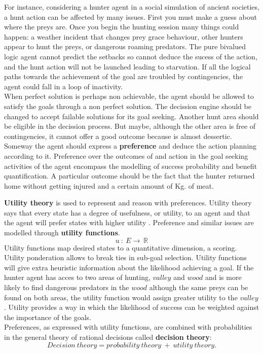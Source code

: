 \documentclass[11pt,oneside,a4paper,openright]{report}
\begin{document}
\begin{description}
\begin{description}
		For instance, considering a hunter agent in a social simulation of ancient societies, a hunt action
		can be affected by many issues. First you must make a guess about where the preys are. Once you 
		begin the hunting session many things could happen: a weather incident that changes prey grace
		behaviour, other hunters appear to hunt the preys, or dangerous roaming predators. The pure bivalued
		logic agent cannot predict the setbacks so cannot deduce the sucess of the action, and the hunt 
		action will not be launched leading to starvation. If all the logical paths towards the achievement 
		of the goal are troubled by contingencies, the agent could fall in a loop of inactivity.\\ 
		When perfect solution is perhaps non achievable, the agent should be allowed to satisfy the goals
		through a non perfect solution. The decission engine should be changed to accept failable solutions 
		for its goal seeking. Another hunt area should be eligible in the decission process. But maybe,
		although the other area is free of contingencies, it cannot offer a good outcome because is almost
		dessertic. Someway the agent should express a \textbf{preference} and deduce the action planning
		according to it. Preference over the outcomes of and action in the goal seeking activities of the 
		agent encompass the modelling of success probability and benefit quantification. A particular outcome
		should be the fact that the hunter returned home without getting injured and a certain amount of 
		Kg. of meat. 

		\textbf{Utility theory} is used to represent and reason with preferences. Utility theory says that
		every state has a degree of usefulness, or utility, to an agent and that the agent will prefer 
		states with higher utility \cite{RussellNorvig}. Preference and similar issues are modelled through
		\textbf{utility functions}. 
			\begin{equation}
			 u\ :\ E \rightarrow \ \mathbb{R}
			\end{equation}
		Utility functions map desired states to a quantitative dimension, a scoring. Utility ponderation 
		allows to break ties in sub-goal selection. Utility functions will give extra heuristic information
		about the likelihood achieving a goal. If the hunter agent has acces to two areas of hunting, $valley$
		and $wood$ and is more likely to find dangerous predators in the $wood$ although the same preys can 
		be found on both areas, the utility function would assign greater utility to the $valley$. Utility
 		provides a way in which the likelihood of success can be weighted against the importance of the goals.\\
		Preferences, as expressed with utility functions, are combined with probabilities in the general 
		theory of rational decisions called \textbf{decision theory}: \cite{RussellNorvig}
			\begin{equation}
			Decision\ theory = probability\ theory\ +\ utility\ theory .
			\end{equation}


\end{description}
\end{description}
\end{document}
